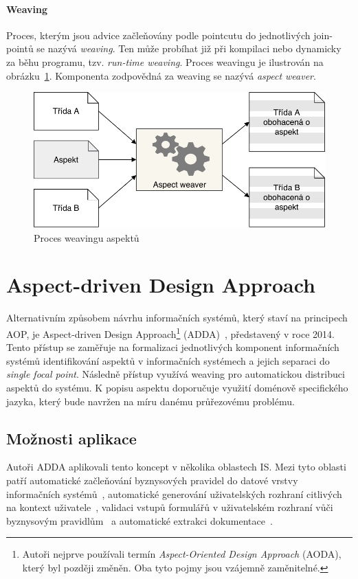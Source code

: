 \paragraph{Weaving}
Proces, kterým jsou advice začleňovány podle pointcutu do
jednotlivých join-pointů se nazývá \textit{weaving}. Ten může
probíhat již při kompilaci nebo dynamicky za běhu programu,
tzv. \textit{run-time weaving}. Proces weavingu je ilustrován
na obrázku~\ref{fig:aspect-weaving}. Komponenta zodpovědná za
weaving se nazývá \textit{aspect weaver}.

\begin{figure}[t]
    \centering
    \includegraphics[keepaspectratio=true, width=0.7\linewidth]{figures/aspect-weaving.pdf}
    \caption{Proces weavingu aspektů}
    \label{fig:aspect-weaving}
\end{figure}

\section{Aspect-driven Design Approach}

Alternativním způsobem návrhu informačních systémů, který staví na principech \gls{AOP},
je Aspect-driven Design Approach\footnote{Autoři nejprve používali termín \textit{Aspect-Oriented
Design Approach} (AODA), který byl později změněn. Oba tyto pojmy jsou vzájemně zaměnitelné.}
(\gls{ADDA})~\cite{cemus2014aspect}, představený v roce 2014.
Tento přístup se zaměřuje na formalizaci jednotlivých komponent informačních systémů identifikování aspektů
v informačních systémech a jejich separaci do \textit{single focal point}.
Následně přístup využívá weaving pro automatickou distribuci aspektů do systému.
K popisu aspektu doporučuje využití doménově specifického jazyka, který bude navržen na
míru danému průřezovému problému.

\subsection{Možnosti aplikace}

Autoři \gls{ADDA} aplikovali tento koncept v několika oblastech \gls{IS}.
Mezi tyto oblasti patří automatické začleňování byznysových pravidel
do datové vrstvy informačních systémů~\cite{cemus2015automated}, automatické
generování uživatelských rozhraní citlivých na kontext uživatele~\cite{cemus2017separation},
validaci vstupů formulářů v uživatelském rozhraní vůči byznysovým pravidlům~\cite{cemus2016context}\cite{cemus2017separation}
a automatické extrakci dokumentace~\cite{cemus2017automated}.

